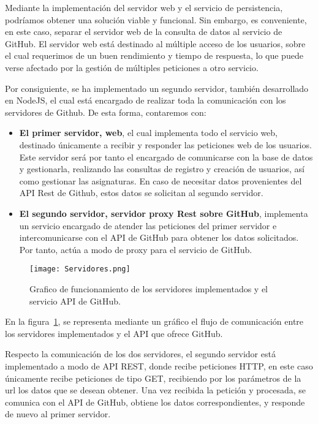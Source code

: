 Mediante la implementación del servidor web y el servicio de persistencia,
podríamos obtener una solución viable y funcional. Sin embargo, es
conveniente, en este caso, separar el servidor web de la consulta de datos
al servicio de GitHub. El servidor web está destinado al múltiple acceso de
los usuarios, sobre el cual requerimos de un buen rendimiento y tiempo de
respuesta, lo que puede verse afectado por la gestión de múltiples
peticiones a otro servicio.

Por consiguiente, se ha implementado un segundo servidor, también
desarrollado en NodeJS, el cual está encargado de realizar toda la
comunicación con los servidores de Github. De esta forma, contaremos con:

\begin{itemize}
\item \textbf{El primer servidor, web}, el cual implementa todo el
  servicio web, destinado únicamente a recibir y responder las peticiones
  web de los usuarios. Este servidor será por tanto el encargado de
  comunicarse con la base de datos y gestionarla, realizando las consultas
  de registro y creación de usuarios, así como gestionar las asignaturas.
  En caso de necesitar datos provenientes del API Rest de Github, estos
  datos se solicitan al segundo servidor.
\item \textbf{El segundo servidor, servidor proxy Rest sobre GitHub},
  implementa un servicio encargado de atender las peticiones del primer
  servidor e intercomunicarse con el API de GitHub para obtener los datos
  solicitados. Por tanto, actúa a modo de proxy para el servicio de GitHub.
\end{itemize}

\begin{figure}[h!]
  \texttt{[image: Servidores.png]}
  \caption{Grafico de funcionamiento de los servidores implementados y el
    servicio API de GitHub.}
  \label{figure:servidores}
\end{figure}

En la figura~\ref{figure:servidores}, se representa mediante un gráfico el
flujo de comunicación entre los servidores implementados y el API que
ofrece GitHub.

Respecto la comunicación de los dos servidores, el segundo servidor está
implementado a modo de API REST, donde recibe peticiones HTTP, en este caso
únicamente recibe peticiones de tipo GET, recibiendo por los parámetros de
la url los datos que se desean obtener. Una vez recibida la petición y
procesada, se comunica con el API de GitHub, obtiene los datos
correspondientes, y responde de nuevo al primer servidor.

